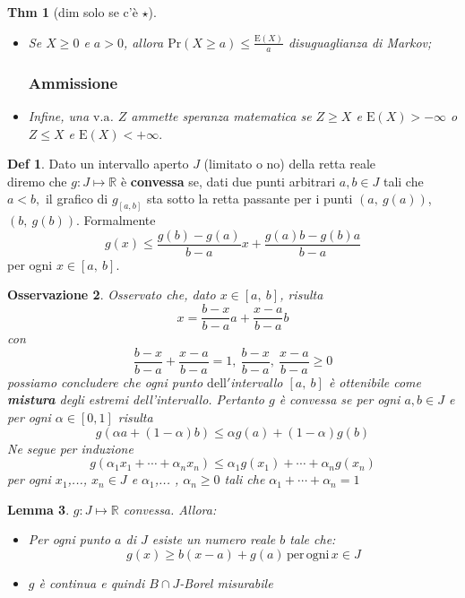 \documentclass[a4paper,11pt]{article}
\theoremstyle{plain}
\newtheorem{thm}{Thm}[section]
\newtheorem{lem}[thm]{Lemma}
\newtheorem{oss}[thm]{Osservazione}
\theoremstyle{definition}
\newtheorem{defn}{Def}[section]
\theoremstyle{remark}
\begin{document}
\begin{thm}[dim solo se c'è $\star$]
\begin{itemize}
\subsubsection{Disuguaglianza di Markov}
\item [$\star \star$] Se $X\geq 0$ e $a>0$, allora
$\mathrm{P}\mathrm{r}(X\geq a)\leq \displaystyle \frac{\mathrm{E}(X)}{a}$ disuguaglianza di Markov; 
\subsubsection{Ammissione }
\item Infine, una $\mathrm{v}.\mathrm{a}$. $Z$ ammette speranza matematica se $Z\geq X$ e $\mathrm{E}(X)>-\infty$ o $Z\leq X$ e $\mathrm{E}(X)<+\infty.$
\end{itemize}
\end{thm}

\begin{defn} Dato un  intervallo aperto $J$ (limitato o no) della retta reale\\
diremo che $g: J\mapsto \mathbb{R}$ è \textbf{convessa} se, dati due punti arbitrari $a, b\in J$ tali che $a<b,$ il grafico di $g_{[a,b]}$ sta sotto la retta passante per i punti $(a,\ g(a))$, $(b,\ g(b))$. Formalmente
$$
g(x)\leq\frac{g(b)-g(a)}{b-a}x+\frac{g(a)b-g(b)a}{b-a}
$$
per ogni $x\in[a,\ b].$
\end{defn}

\begin{oss}
Osservato che, dato $x\in[a,\ b]$, risulta
$$
x=\frac{b-x}{b-a}a+\frac{x-a}{b-a}b
$$
con
$$
\frac{b-x}{b-a}+\frac{x-a}{b-a}=1,\ \frac{b-x}{b-a},\ \frac{x-a}{b-a}\geq 0
$$
possiamo concludere che ogni punto $\mathrm{d}\mathrm{e}\mathrm{l}\mathrm{l}'$intervallo $[a,\ b]$ \`{e} ottenibile come \textbf{mistura} degli estremi dell'intervallo.
\noindent
Pertanto $g$ \`{e} convessa se per ogni $a, b\in J$ e per ogni $\alpha\in [0, 1]$ risulta
$$
g(\alpha a+(1-\alpha)b)\leq\alpha g(a)+(1-\alpha)g(b)
$$
Ne segue per induzione
$$
g(\alpha_{1}x_{1}+\cdots+\alpha_{n}x_{n})\leq\alpha_{1}g(x_{1})+\cdots+\alpha_{n}g(x_{n})
$$
per ogni $x_{1}$,..., $x_{n}\in J$ e $\alpha_{1}$,... , $\alpha_{n}\geq 0$ tali che $\alpha_{1}+\cdots+\alpha_{n}=1$
\end{oss}

\begin{lem} $g:J\mapsto \mathbb{R}$ convessa. Allora:
\begin{itemize}
\item Per ogni punto $a$ di $J$ esiste un numero reale $b$ tale che:
$$
g(x)\geq b(x-a)+g(a) \, \mathrm{per} \, \mathrm{ogni}\, x \in J
$$
\item $g$ \`{e} continua e quindi $B\cap J$-Borel misurabile
\end{itemize}
\end{lem}
\end{document}
